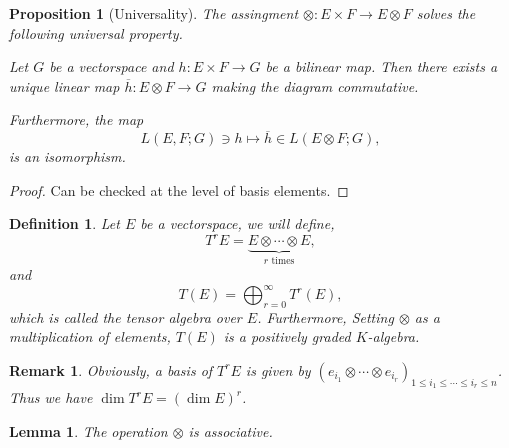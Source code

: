 \documentclass[10pt]{article}
\newtheorem{proposition}{Proposition}[section]
\newtheorem{definition}{Definition}[section]
\newtheorem{lemma}{Lemma}[section]
\newtheorem{remark}{Remark}[section]
\begin{document}
\begin{proposition}[Universality]
  \label{proposition_10_3}
  The assingment $\otimes :E\times F\to E\otimes F$ solves the following universal property. \\
  \par Let $G$ be a vectorspace and $h:E\times F\to G$ be a bilinear map. Then there exists a unique linear map $\overline{h}:E\otimes F\to G$ making the diagram commutative.
  \begin{center}
  \end{center}
  Furthermore, the map 
  \begin{equation*}
    L(E,F;G)\ni h\mapsto \overline{h}\in L(E\otimes F;G),
  \end{equation*}
  is an isomorphism.
\end{proposition}
\begin{proof}
  Can be checked at the level of basis elements.
\end{proof}
\begin{definition}
  Let $E$ be a vectorspace, we will define,
  \begin{equation*}
    T^rE = \underbrace{E\otimes\cdots\otimes E}_{\text{$r$ times}},
  \end{equation*}
  and 
  \begin{equation*}
    T(E) = \bigoplus_{r=0}^\infty T^r(E),
  \end{equation*}
  which is called the tensor algebra over $E$. Furthermore, Setting $\otimes$ as a multiplication of elements, $T(E)$ is a positively graded $K$-algebra. 
\end{definition}
\begin{remark}
  Obviously, a basis of $T^rE$ is given by $(e_{i_1}\otimes \cdots\otimes e_{i_r})_{1\leq i_1\leq\cdots\leq i_r\leq n}$. Thus we have $\dim T^rE = (\dim E)^r$.
\end{remark}

\begin{lemma}
  The operation $\otimes$ is associative.
  \begin{center}
  \end{center}
\end{lemma}
\end{document}
